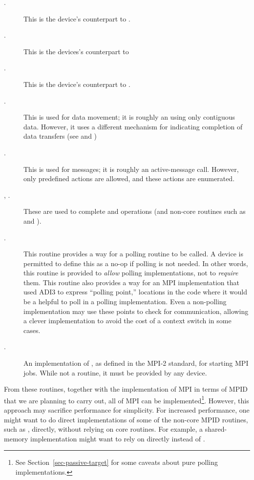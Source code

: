 \documentclass{article}
\begin{document}
\begin{description}
\item[.] This is the device's counterpart to
. 
\item[.] This is the devices's counterpart to
\item[.] This is the device's counterpart to .
\item[.] This is used for data movement; it is roughly an
 using only contiguous data.  However, it uses a
different mechanism for indicating completion of data transfers (see  and )
\item[.] This is used for messages; it is roughly an
active-message call.  However, only predefined actions are allowed,
and these actions are enumerated.
\item[, .] These
are used to complete  
and  operations (and non-core routines such as
 and ). 
\item[.] This routine provides a way for a polling routine to
be called.  A device is permitted to define this as a no-op if polling
is not needed.  In other words, this routine is provided to
\emph{allow} polling implementations, not to \emph{require} them.
This routine also provides a way for an MPI implementation that used
ADI3 to express ``polling point,'' locations in the code where it
would be a helpful to poll in a polling implementation.  Even a
non-polling implementation may use these points to check for
communication, allowing a clever implementation to avoid the cost of a
context switch in some cases. 
\item[.] An implementation of , as defined in the
  MPI-2 standard, for starting MPI jobs.  While not a routine, it must be 
  provided by any device.  
\end{description}
From these routines, together with the implementation of MPI in terms of MPID
that we are planning to carry out, all of MPI can be implemented\footnote{See
Section~\ref{sec-passive-target} for some caveats about pure polling
implementations.}.  However, this approach may sacrifice performance
for simplicity.  For increased performance, one might want to do direct
implementations of some of the non-core MPID routines, such as
, directly, without relying on core routines.  For example, a
shared-memory implementation might want to rely on  directly
instead of .
\end{document}
